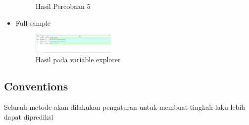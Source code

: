 \begin{itemize}
\begin{figure}[H]
		\centering
		\caption{Hasil Percobaan 5}
	\end{figure}
	\item Full sample \hfill \break 
	\begin{figure}[H]
		\includegraphics[width=4cm]{figures/1174035/chapter1/4_var.png}
		\centering
		\caption{Hasil pada variable explorer}
	\end{figure}
\end{itemize}
\subsection{Conventions}
Seluruh metode akan dilakukan pengaturan untuk membuat tingkah laku lebih dapat diprediksi
